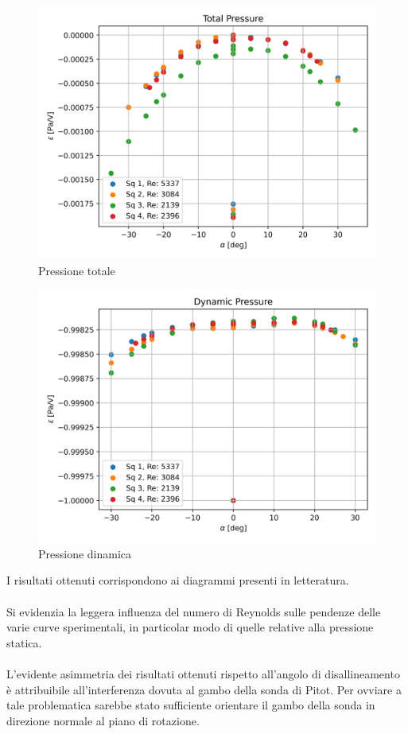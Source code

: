 \begin{figure}[h!]
    \centering
    \includegraphics[width=.76\textwidth]{images/2/ptot.png}
    \caption{Pressione totale}
\end{figure}

\newpage
\begin{figure}[ht]
    \centering
    \includegraphics[width=.76\textwidth]{images/2/q.png}
    \caption{Pressione dinamica}
\end{figure}

\noindent I risultati ottenuti corrispondono ai diagrammi presenti in letteratura.\\\\
Si evidenzia la leggera influenza del numero di Reynolds sulle pendenze delle varie curve sperimentali, in particolar modo di quelle relative alla pressione statica.\\\\
L'evidente asimmetria dei risultati ottenuti rispetto all'angolo di disallineamento è attribuibile all'interferenza dovuta al gambo della sonda di Pitot. Per ovviare a tale problematica sarebbe stato sufficiente orientare il gambo della sonda in direzione normale al piano di rotazione.

